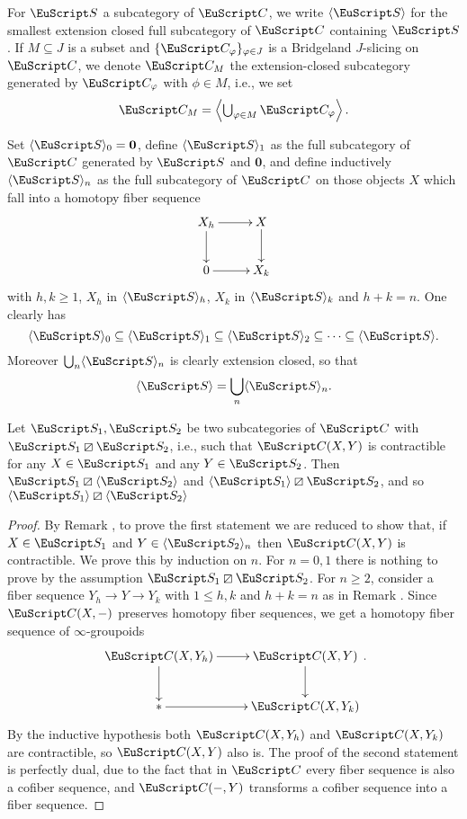 \begin{notat}\label{notation.bridg-slicing}
For $\cate{S}$ a subcategory of $\C$, we write $\langle \cate{S}\rangle$ for the smallest extension closed full subcategory of $\C$ containing $\cate{S}$. 
If $M \subseteq J$ is a subset and $\{ \C_{\phi} \}_{\phi \in J}$ is a Bridgeland $J$-slicing on $\C$, we denote $\C_M$ the extension-closed subcategory generated by $\C_{\phi}$ with $\phi \in M$, i.e., we set 
\[
\textstyle \C_M=\left\langle \bigcup_{\phi\in M}\C_\phi \right\rangle.
\]
\end{notat}
\begin{remark}\label{extensions}
Set  $\langle \cate{S}\rangle_0=\mathbf{0}$,  define $\langle \cate{S}\rangle_1$ as the full subcategory of $\C$ generated by $\cate{S}$ and $\mathbf{0}$, and define inductively $\langle \cate{S}\rangle_n$ as the full subcategory of $\C$ on those objects $X$ which fall into a homotopy fiber sequence
\[
\xymatrix{
X_h\ar[r]\ar[d]& X\ar[d]\\
0\ar[r] &X_k
}
\]
with $h,k\geq 1$, $X_h$ in $\langle \cate{S}\rangle_h$, $X_k$ in $\langle \cate{S}\rangle_k$ and $h+k=n$. One clearly has 
\[
\langle \cate{S}\rangle_0\subseteq \langle \cate{S}\rangle_1 \subseteq \langle \cate{S}\rangle_2\subseteq\cdots \subseteq \langle \cate{S}\rangle.
\]
Moreover $\bigcup_n \langle \cate{S}\rangle_n$ is clearly extension closed, so that
\[
\langle \cate{S}\rangle =\bigcup_n \langle \cate{S}\rangle_n.
\] 
\end{remark}
\begin{lemma}\label{closure}
Let $\cate{S}_1,\cate{S}_2$ be two subcategories of $\C$ with $\cate{S}_1\orth \cate{S}_2$, i.e., such that $\C(X,Y)$ is contractible for any $X\in \cate{S}_1$ and any $Y\in\cate{S}_2$. Then $\cate{S}_1\orth \langle\cate{S}_2\rangle$ and $\langle\cate{S}_1\rangle\orth \cate{S}_2$, and so $\langle\cate{S}_1\rangle\orth \langle\cate{S}_2\rangle$
\end{lemma}
\begin{proof}
By Remark , to prove the first statement we are reduced to show that, if $X\in \cate{S}_1$ and $Y\in \langle\cate{S}_2\rangle_n$ then $\C(X,Y)$ is contractible. We prove this by induction on $n$. For $n=0,1$ there is nothing to prove by the assumption $\cate{S}_1\orth \cate{S}_2$. For $n\geq 2$, consider a fiber sequence $Y_h\to Y\to Y_k$ with $1\leq h,k$ and $h+k=n$ as in Remark . Since $\C(X,-)$ preserves homotopy fiber sequences, we get a homotopy fiber sequence of $\infty$-groupoids
\[
\xymatrix{
\C(X,Y_h)\ar[r]\ar[d]& \C(X,Y)\ar[d]\\
{*}\ar[r] &\C(X,Y_k)
}.
\]
By the inductive hypothesis both $\C(X,Y_h)$ and $\C(X,Y_k)$ are contractible, so $\C(X,Y)$ also is. The proof of the second statement is perfectly dual, due to the fact that in $\C$ every fiber sequence is also a cofiber sequence, and $\C(-,Y)$ transforms a cofiber sequence into a fiber sequence.
\end{proof}
